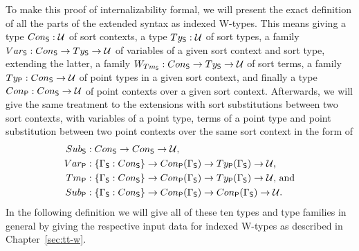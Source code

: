 To make this proof of internalizability formal, we will present the exact definition
of all the parts of the extended syntax as indexed W-types.
This means giving a type ${Con_{\mathsf{S}}} : \mathcal{U}$ of sort contexts,
a type ${Ty_{\mathsf{S}}} : \mathcal{U}$ of sort types,
a family ${Var_{\mathsf{S}}} : {Con_{\mathsf{S}}} \to {Ty_{\mathsf{S}}} \to \mathcal{U}$ of variables of a given
sort context and sort type,
extending the latter, a family $W_{Tm_{\mathsf{S}}} : {Con_{\mathsf{S}}} \to {Ty_{\mathsf{S}}} \to \mathcal{U}$
of sort terms,
a family ${Ty_{\mathsf{P}}} : {Con_{\mathsf{S}}} \to \mathcal{U}$ of point types in a given sort context,
and finally a type ${Con_{\mathsf{P}}} : {Con_{\mathsf{S}}} \to \mathcal{U}$ of point contexts over a
given sort context.
Afterwards, we will give the same treatment to the extensions with
sort substitutions between two sort contexts, with variables
of a point type, terms of a point type and point substitution between two point
contexts over the same sort context in the form of
\begin{align*}
{Sub_{\mathsf{S}}}
  &: {Con_{\mathsf{S}}} \to {Con_{\mathsf{S}}} \to \mathcal{U} \text{,} \\
{Var_{\mathsf{P}}}
  &: \{\Gamma_{\mathsf{S}} : {Con_{\mathsf{S}}}\} \to {Con_{\mathsf{P}}}(\Gamma_{\mathsf{S}}) \to {Ty_{\mathsf{P}}}(\Gamma_{\mathsf{S}}) \to \mathcal{U} \text{,}\\
{Tm_{\mathsf{P}}}
  &: \{\Gamma_{\mathsf{S}} : {Con_{\mathsf{S}}}\} \to {Con_{\mathsf{P}}}(\Gamma_{\mathsf{S}}) \to {Ty_{\mathsf{P}}}(\Gamma_{\mathsf{S}}) \to \mathcal{U} \text{, and}\\
{Sub_{\mathsf{P}}}
  &: \{\Gamma_{\mathsf{S}} : {Con_{\mathsf{S}}}\} \to {Con_{\mathsf{P}}}(\Gamma_{\mathsf{S}}) \to {Con_{\mathsf{P}}}(\Gamma_{\mathsf{S}}) \to \mathcal{U} \text{.}
\end{align*}
In the following definition we will give all of these ten types and type families
in general by giving the respective input data for indexed W-types as described
in Chapter~\ref{sec:tt-w}.

